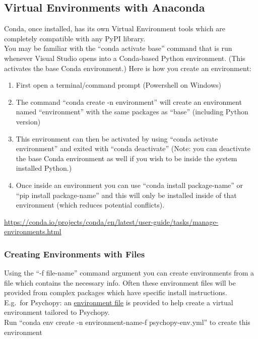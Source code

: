\documentclass[12pt]{article}
\begin{document}
        \subsection{Virtual Environments with Anaconda}
            Conda, once installed, has its own Virtual Environment tools which are completely compatible with any PyPI library.
            \\You may be familiar with the ``conda activate base'' command that is run whenever Visual Studio opens into a Conda-based Python environment.
            (This activates the base Conda environment.)
            Here is how you create an environment:
            \begin{enumerate}
                \item First open a terminal/command prompt (Powershell on Windows)
                \item The command ``conda create -n environment'' will create an environment named ``environment'' with the same packages as ``base''  (including Python version)
                \item This environment can then be activated by using ``conda activate environment'' and exited with ``conda deactivate'' (Note: you can deactivate the base Conda environment as well if you wish to be inside the system installed Python.)
                \item Once inside an environment you can use “conda install \textlangle package-name\textrangle” or “pip install \textlangle package-name\textrangle” and this will only be installed inside of that environment (which reduces potential conflicts).
            \end{enumerate}
            \url{https://conda.io/projects/conda/en/latest/user-guide/tasks/manage-environments.html}
            \subsubsection{Creating Environments with Files}
                Using the ``-f \textlangle file-name\textrangle'' command argument you can create environments from a file which contains the necessary info.
                Often these environment files will be provided from complex packages which have specific install instructions.
                \\E.g.\ for Psychopy: an \href{https://raw.githubusercontent.com/psychopy/psychopy/master/conda/psychopy-env.yml}{environment file} is provided to help create a virtual environment tailored to Psychopy.
                \\Run ``conda env create -n \textlangle environment-name\textrangle -f psychopy-env.yml'' to create this environment
\end{document}
